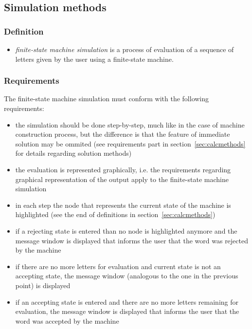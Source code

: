 \documentclass{article}
\begin{document}
\subsection{Simulation methods}

\subsubsection*{Definition}
\begin{itemize}[noitemsep,nolistsep]

  \item \textit{finite-state machine simulation} is a process of evaluation of a sequence
  of letters given by the user using a finite-state machine.

\end{itemize}

\subsubsection*{Requirements}
The finite-state machine simulation must conform with the following requirements:
\begin{itemize}

  \item the simulation should be done step-by-step, much like in the case of machine construction
  process, but the difference is that the feature of immediate solution may be ommited
  (see requirements part in section~\ref{sec:calcmethods} for details regarding solution methods)
  
  \item the evaluation is represented graphically, i.e. the requirements regarding graphical
  representation of the output apply to the finite-state machine simulation

  \item in each step the node that represents the current state of the machine is highlighted (see
  the end of definitions in section~\ref{sec:calcmethods})
  
  \item if a rejecting state is entered than no node is highlighted anymore and the message window
  is displayed that informs the user that the word was rejected by the machine
  
  \item if there are no more letters for evaluation and current state is not an accepting state, the
  message window (analogous to the one in the previous point) is displayed
  
  \item if an accepting state is entered and there are no more letters remaining for evaluation, the
  message window is displayed that informs the user that the word was accepted by the machine

\end{itemize}
\end{document}
